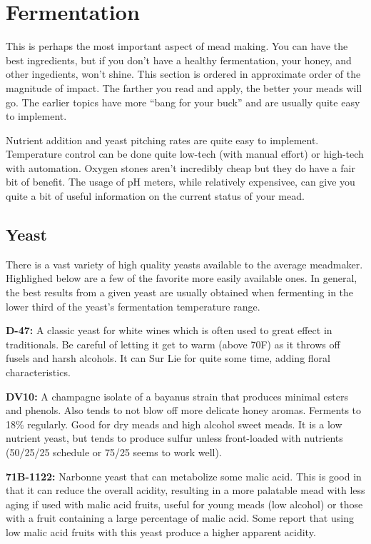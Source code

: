 \documentclass{article}
\begin{document}
\section{Fermentation}
 This is perhaps the most important aspect of mead making. You can have the best ingredients, but if you don't 
 have a healthy fermentation, your honey, and other ingedients, won't shine. This section is ordered in 
 approximate order of the magnitude of impact. The farther you read and apply, the better your meads will go. 
 The earlier topics have more ``bang for your buck'' and are  usually quite easy to implement. 

 Nutrient addition and yeast pitching rates are quite easy to implement. Temperature control can be done quite 
 low-tech (with manual effort) or high-tech with automation. Oxygen stones aren't incredibly cheap but they do 
 have a fair bit of benefit. The usage of pH meters, while relatively expensivee, can give you quite a bit of 
 useful information on the current status of your mead.
 \subsection{Yeast}
  There is a vast variety of high quality yeasts available to the average meadmaker. Highlighed below are a few 
  of the favorite more easily available ones. In general, the best results from a given yeast are usually obtained 
  when fermenting in the lower third of the yeast's fermentation temperature range.

  \textbf{D-47:} A classic yeast for white wines which is often used to great effect in traditionals. 
   Be careful of letting it get to warm (above 70\textdegree F) as it throws off fusels and harsh alcohols. 
   It can Sur Lie for quite some time, adding floral characteristics.

  \textbf{DV10:} A champagne isolate of a bayanus strain that produces minimal esters and phenols. Also tends to 
   not blow off more delicate honey aromas. Ferments to 18\% regularly. Good for dry meads and high alcohol sweet 
   meads. It is a low nutrient yeast, but tends to produce sulfur unless front-loaded with nutrients 
   (50/25/25 schedule or 75/25 seems to work well).

  \textbf{71B-1122:} Narbonne yeast that can metabolize some malic acid. 
   This is good in that it can reduce the overall acidity, resulting in a more palatable mead with less aging if
   used with malic acid fruits, useful for young meads (low alcohol) or those with a fruit containing a large 
   percentage of malic acid. 
   Some report that using low malic acid fruits with this yeast produce a higher apparent acidity.
\end{document}
